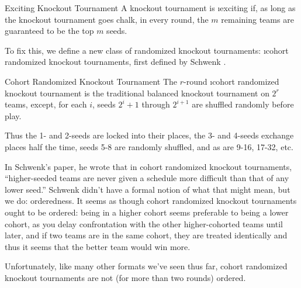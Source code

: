 {    \begin{definition}{Exciting Knockout Tournament}{}
        A knockout tournament is \i{exciting} if, as long as the knockout tournament goes chalk, in every round, the $m$ remaining teams are guaranteed to be the top $m$ seeds.
    \end{definition}
    
    To fix this, we define a new class of randomized knockout tournaments: \i{cohort randomized knockout tournaments}, first defined by Schwenk \cite{randomized_cohort}.
    
    \begin{definition}{Cohort Randomized Knockout Tournament}{}
        The $r$-round \i{cohort randomized knockout tournament} is the traditional balanced knockout tournament on $2^r$ teams, except, for each $i$, seeds $2^i + 1$ through $2^{i+1}$ are shuffled randomly before play.
    \end{definition}

    Thus the 1- and 2-seeds are locked into their places, the 3- and 4-seeds exchange places half the time, seeds 5-8 are randomly shuffled, and as are 9-16, 17-32, etc. 
    

    In Schwenk's paper, he wrote that in cohort randomized knockout tournaments, ``higher-seeded teams are never given a schedule more difficult than that of any lower seed.'' Schwenk didn't have a formal notion of what that might mean, but we do: orderedness. It seems as though cohort randomized knockout tournaments ought to be ordered: being in a higher cohort seems preferable to being a lower cohort, as you delay confrontation with the other higher-cohorted teams until later, and if two teams are in the same cohort, they are treated identically and thus it seems that the better team would win more.

    Unfortunately, like many other formats we've seen thus far, cohort randomized knockout tournaments are not (for more than two rounds) ordered.

}
